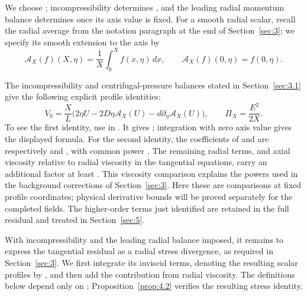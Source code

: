 We choose ; incompressibility determines
, and the leading radial momentum balance determines
 once its axis value is fixed. For a smooth radial
scalar, recall the radial average from the notation paragraph at the end of
Section~\ref{sec:3}; we specify its smooth extension to the axis by
\begin{equation}
 \mathcal A_X(f)(X,\eta)=\frac1X\int_0^X f(x,\eta)\,dx,
 \qquad
 \mathcal A_X(f)(0,\eta)=f(0,\eta).
\tag{4.6}\label{eq:4.6}
\end{equation}

%
The incompressibility and centrifugal-pressure balances stated in
Section~\ref{sec:3.1} give the following explicit profile identities:
\begin{equation}
 V_0=\frac{X}{L}\bigl(2\eta U-2D\eta\mathcal A_X(U)
      -d\partial_\eta\mathcal A_X(U)\bigr),
 \qquad
 \Pi_X=\frac{E^2}{2X}.
\tag{4.7}\label{eq:4.7}
\end{equation}
To see the first identity, use  in
. It gives
;
integration with zero axis value gives the displayed formula. For the second
identity, the coefficients of  and
 are respectively
 and
, with common power
. The remaining radial terms, and axial
viscosity relative to radial viscosity in the tangential equations, carry an
additional factor at least . This viscosity
comparison explains the powers  used in the
background corrections of Section~\ref{sec:3}. Here these are comparisons at
fixed profile coordinates; physical derivative bounds will be proved
separately for the completed fields. The higher-order terms just identified
are retained in the full residual and treated in Section~\ref{sec:5}.

With incompressibility and the leading radial balance imposed, it remains to
express the tangential residual as a radial stress divergence, as required in
Section~\ref{sec:3}. We first integrate its inviscid terms, denoting the
resulting scalar profiles by , and then add the
contribution from radial viscosity. The definitions below depend only on
; Proposition~\ref{prop:4.2} verifies the resulting
stress identity.

